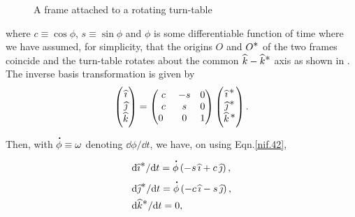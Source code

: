 \begin{figure}[H] 
\begin{center}
\caption{A frame attached to a rotating 
turn-table}\label{fig2.4}
\end{center}
\vspace{-.5cm}
\end{figure}
where $c\equiv \cos \phi$, $s\equiv \sin \phi$ and 
$\phi$ is some differentiable function of time where we 
have assumed, for simplicity, that the origins $O$ and 
$O^{{\textstyle \ast}}$ of the two frames coincide and the 
turn-table rotates about the common ${\widehat{k}}-{\widehat{k}}^{{\textstyle \ast}}$ 
axis as shown in .
The inverse basis transformation is given by
\begin{align}\label{nif.39}
\begin{pmatrix}{\ensuremath{\widehat{\imath}}}\\ {\widehat{\jmath}}\\{\widehat{k}}\end{pmatrix}
=\begin{pmatrix} c & - s & 0\\
c & s& 0 \\
0\;\;&0&1\end{pmatrix} \begin{pmatrix}{\ensuremath{\widehat{\imath}}}^{\,{\textstyle \ast}}\\
{\widehat{\jmath}}^{\,{\textstyle \ast}}\\{\widehat{k}}^{\,{\textstyle \ast}}\end{pmatrix} .
\end{align}
Then, with ${\overset{\hspace*{1.5pt}\centerdot}{\phi} }\equiv {\omega} $ denoting $
\dd \phi/\dd t $, we have, on using Eqn.\eqref{nif.42},
\begin{align}\label{nif.39a}
&\mathrm{d} {\widehat{\imath}}^{{\textstyle \ast}}/\mathrm{d} t ={\overset{\hspace*{1.5pt}\centerdot}{\phi} }
\left(-s \,{\widehat{\imath}}+c \,{\widehat{\jmath}}\right), \notag \\
&\mathrm{d} {\widehat{\jmath}}^{{\textstyle \ast}}/\mathrm{d} t ={\overset{\hspace*{1.5pt}\centerdot}{\phi} }\left(
-c\,{\widehat{\imath}}-s\, {\widehat{\jmath}}\right), \notag \\
&\mathrm{d} {\widehat{k}}^{{\textstyle \ast}}/\mathrm{d} t =0,
\end{align}
